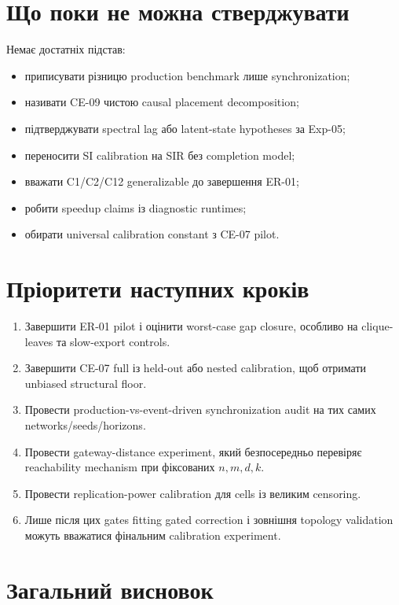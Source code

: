 \documentclass[11pt,a4paper]{article}
\begin{document}
\section{Що поки не можна стверджувати}

Немає достатніх підстав:
\begin{itemize}
 \item приписувати різницю production benchmark лише synchronization;
 \item називати CE-09 чистою causal placement decomposition;
 \item підтверджувати spectral lag або latent-state hypotheses за Exp-05;
 \item переносити SI calibration на SIR без completion model;
 \item вважати C1/C2/C12 generalizable до завершення ER-01;
 \item робити speedup claims із diagnostic runtimes;
 \item обирати universal calibration constant з CE-07 pilot.
\end{itemize}

\section{Пріоритети наступних кроків}

\begin{enumerate}
 \item Завершити ER-01 pilot і оцінити worst-case gap closure, особливо на
 clique-leaves та slow-export controls.
 \item Завершити CE-07 full із held-out або nested calibration, щоб отримати
 unbiased structural floor.
 \item Провести production-vs-event-driven synchronization audit на тих самих
 networks/seeds/horizons.
 \item Провести gateway-distance experiment, який безпосередньо перевіряє
 reachability mechanism при фіксованих $n,m,d,k$.
 \item Провести replication-power calibration для cells із великим censoring.
 \item Лише після цих gates fitting gated correction і зовнішня topology
 validation можуть вважатися фінальним calibration experiment.
\end{enumerate}

\section{Загальний висновок}
\end{document}
